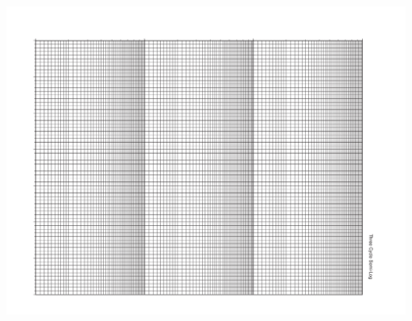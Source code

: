 \documentclass[onepage,swedish,a4paper,12pt]{scrbook}
\begin{document}
\hspace{-20mm}\includegraphics[angle=90,scale=0.85]{linlog-papper.pdf}
\end{document}
